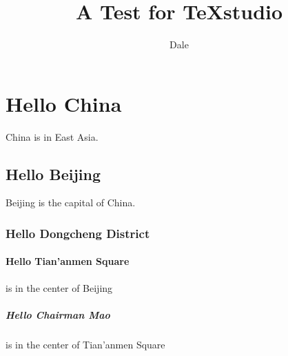 \documentclass{article}
\title{A Test for TeXstudio}
\author{Dale}
\begin{document}
 
	\maketitle
	\tableofcontents 
	\section{Hello China} China is in East Asia. 
	\subsection{Hello Beijing} Beijing is the capital of China. 
	\subsubsection{Hello Dongcheng District} 
	\paragraph{Hello Tian'anmen Square}is in the center of Beijing 
	\subparagraph{Hello Chairman Mao} is in the center of Tian'anmen Square 
\end{document}
